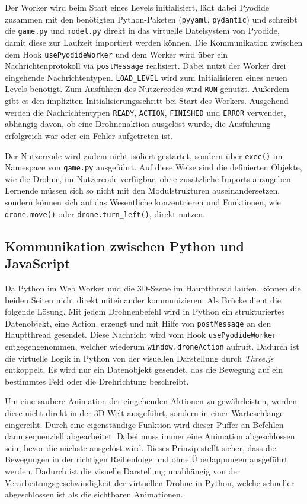 \documentclass[a4paper,12pt]{article}
\begin{document}
	Der Worker wird beim Start eines Levels initialisiert, lädt dabei Pyodide zusammen 
	mit den benötigten Python-Paketen (\texttt{pyyaml}, \texttt{pydantic}) und schreibt 
	die \texttt{game.py} und \texttt{model.py} direkt in das virtuelle Dateisystem von 
	Pyodide, damit diese zur Laufzeit importiert werden können. Die Kommunikation zwischen 
	dem Hook \texttt{usePyodideWorker} und dem Worker wird über ein Nachrichtenprotokoll 
	via \texttt{postMessage} realisiert. Dabei nutzt der Worker drei eingehende 
	Nachrichtentypen. \texttt{LOAD\_LEVEL} wird zum Initialisieren eines neuen Levels benötigt. 
	Zum Ausführen des Nutzercodes wird \texttt{RUN} genutzt. Außerdem gibt es den impliziten 
	Initialisierungsschritt bei Start des Workers. Ausgehend werden die Nachrichtentypen 
	\texttt{READY}, \texttt{ACTION}, \texttt{FINISHED} und \texttt{ERROR} verwendet, abhängig 
	davon, ob eine Drohnenaktion ausgelöst wurde, die Ausführung erfolgreich war oder ein 
	Fehler aufgetreten ist.

	Der Nutzercode wird zudem nicht isoliert gestartet, sondern über \texttt{exec()} im 
	Namespace von \texttt{game.py} ausgeführt. Auf diese Weise sind die definierten Objekte, 
	wie die Drohne, im Nutzercode verfügbar, ohne zusätzliche Imports anzugeben. Lernende 
	müssen sich so nicht mit den Modulstrukturen auseinandersetzen, sondern können 
	sich auf das Wesentliche konzentrieren und Funktionen, wie \texttt{drone.move()} oder 
	\texttt{drone.turn\_left()}, direkt nutzen.

	\subsection{Kommunikation zwischen Python und JavaScript}
	Da Python im Web Worker und die 3D-Szene im Hauptthread laufen, können die beiden 
	Seiten nicht direkt miteinander kommunizieren. Als Brücke dient die folgende Lösung. 
	Mit jedem Drohnenbefehl wird in Python ein strukturiertes Datenobjekt, eine Action, 
	erzeugt und mit Hilfe von \texttt{postMessage} an den Hauptthread gesendet. Diese 
	Nachricht wird vom Hook \texttt{usePyodideWorker} entgegengenommen, welcher 
	wiederum \texttt{window.droneAction} aufruft. Dadurch ist die virtuelle Logik in 
	Python von der visuellen Darstellung durch \textit{Three.js} entkoppelt. Es wird nur ein 
	Datenobjekt gesendet, das die Bewegung auf ein bestimmtes Feld oder die Drehrichtung 
	beschreibt.
	
	Um eine saubere Animation der eingehenden Aktionen zu gewährleisten, werden diese 
	nicht direkt in der 3D-Welt ausgeführt, sondern in einer Warteschlange eingereiht. 
	Durch eine eigenständige Funktion wird dieser Puffer an Befehlen dann sequenziell 
	abgearbeitet. Dabei muss immer eine Animation abgeschlossen sein, bevor die nächste 
	ausgelöst wird. Dieses Prinzip stellt sicher, dass die Bewegungen in der richtigen 
	Reihenfolge und ohne Überlappungen ausgeführt werden. Dadurch ist die visuelle 
	Darstellung unabhängig von der Verarbeitungsgeschwindigkeit der virtuellen Drohne in 
	Python, welche schneller abgeschlossen ist als die sichtbaren Animationen.
\end{document}
